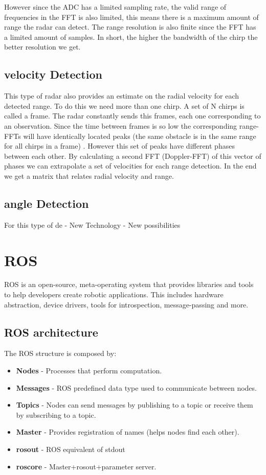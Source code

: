  However since the \ac{ADC} has a limited sampling rate, the valid range of frequencies in the \ac{FFT} is also limited, this means there is a maximum amount of range the radar can detect.
The range resolution is also finite since the \ac{FFT} has a limited amount of samples. In short, the higher the bandwidth of the chirp the better resolution we get.
 
\subsection{velocity Detection}
This type of radar also provides an estimate on the radial velocity for each detected range. To do this we need more than one chirp. A set of N chirps is called a frame. The radar constantly sends this frames, each one corresponding to an observation. Since the time between frames is so low the corresponding range-\ac{FFT}s will have  identically located peaks (the same obstacle is in the same range for all chirps in a frame) . However this set of peaks have different phases between each other. By calculating a second \ac{FFT} (Doppler-FFT) of this vector of phases we can extrapolate a set of velocities  for each range detection. In the end we get a matrix that relates radial velocity and range.
\subsection{angle Detection}
For this type of de
- New Technology
- New possibilities
\section {ROS}
\ac{ROS} is an open-source, meta-operating system that provides libraries and tools to help developers create robotic applications. This includes hardware abstraction, device drivers, tools for introspection, message-passing and more.
\subsection{ROS architecture}
The ROS structure is composed by:
\begin{itemize}
\item \textbf{Nodes} - Processes that perform computation.
\item \textbf{Messages} - ROS predefined data type used to communicate between nodes. 
\item \textbf{Topics} - Nodes can send messages by publishing to a topic or receive them by subscribing to a topic. 
\item \textbf{Master} - Provides registration of names (helps nodes find each other).
\item \textbf{rosout} - ROS equivalent of stdout 
\item \textbf{roscore} - Master+rosout+parameter server. 
\end{itemize}

